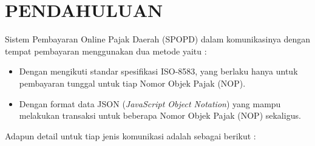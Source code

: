 \chapter{PENDAHULUAN}

Sistem Pembayaran Online Pajak Daerah (SPOPD) dalam komunikasinya dengan tempat pembayaran menggunakan dua metode yaitu :

\begin{itemize}
  \item Dengan mengikuti standar spesifikasi ISO-8583, yang berlaku hanya untuk pembayaran tunggal untuk tiap Nomor Objek Pajak (NOP).
  
  \item Dengan format data JSON (\textit{JavaScript Object Notation}) yang mampu melakukan transaksi untuk beberapa Nomor Objek Pajak (NOP) sekaligus.
\end{itemize}

Adapun detail untuk tiap jenis komunikasi adalah sebagai berikut :

